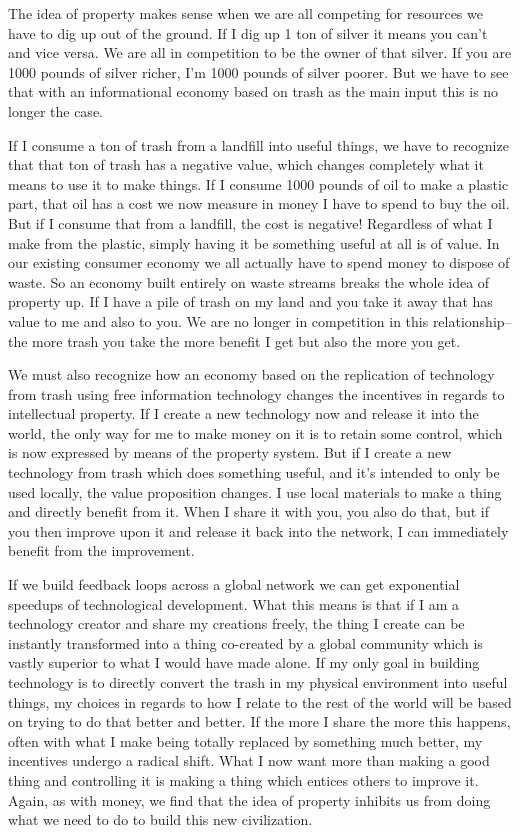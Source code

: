 The idea of property makes sense when we are all competing for resources we have to dig up out of the ground.  If I dig up 1 ton of silver it means you can't and vice versa.  We are all in competition to be the owner of that silver.  If you are 1000 pounds of silver richer, I'm 1000 pounds of silver poorer.  But we have to see that with an informational economy based on trash as the main input this is no longer the case.  

If I consume a ton of trash from a landfill into useful things, we have to recognize that that ton of trash has a negative value, which changes completely what it means to use it to make things.  If I consume 1000 pounds of oil to make a plastic part, that oil has a cost we now measure in money I have to spend to buy the oil.  But if I consume that from a landfill, the cost is negative!  Regardless of what I make from the plastic, simply having it be something useful at all is of value.  In our existing consumer economy we all actually have to spend money to dispose of waste.  So an economy built entirely on waste streams breaks the whole idea of property up.  If I have a pile of trash on my land and you take it away that has value to me and also to you.  We are no longer in competition in this relationship--the more trash you take the more benefit I get but also the more you get.  

We must also recognize how an economy based on the replication of technology from trash using free information technology changes the incentives in regards to intellectual property.  If I create a new technology now and release it into the world, the only way for me to make money on it is to retain some control, which is now expressed by means of the property system. But if I create a new technology from trash which does something useful, and it's intended to only be used locally, the value proposition changes.  I use local materials to make a thing and directly benefit from it.  When I share it with you, you also do that, but if you then improve upon it and release it back into the network, I can immediately benefit from the improvement.  

If we build feedback loops across a global network we can get exponential speedups of technological development.  What this means is that if I am a technology creator and share my creations freely, the thing I create can be instantly transformed into a thing co-created by a global community which is vastly superior to what I would have made alone.  If my only goal in building technology is to directly convert the trash in my physical environment into useful things, my choices in regards to how I relate to the rest of the world will be based on trying to do that better and better.  If the more I share the more this happens, often with what I make being totally replaced by something much better, my incentives undergo a radical shift.  What I now want more than making a good thing and controlling it is making a thing which entices others to improve it.  Again, as with money, we find that the idea of property inhibits us from doing what we need to do to build this new civilization.  

